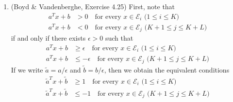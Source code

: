 \documentclass[letterpaper,12pt]{article}
\begin{document}
\begin{enumerate}
\begin{enumerate}
\end{enumerate}

\item (Boyd \& Vandenberghe, Exercise 4.25) First, note that
  \begin{align*}
    a^T x + b &> 0
      \quad \text{for every $x \in \mathcal{E}_i$ ($1 \leq i \leq K$)} \\
    a^T x + b &< 0
      \quad \text{for every $x \in \mathcal{E}_j$ ($K+1 \leq j \leq K+L$)}
  \end{align*}
  if and only if there exists $\epsilon > 0$ such that
  \begin{align*}
    a^T x + b &\geq \epsilon
      \quad \text{for every $x \in \mathcal{E}_i$ ($1 \leq i \leq K$)} \\
    a^T x + b &\leq -\epsilon
      \quad \text{for every $x \in \mathcal{E}_j$ ($K+1 \leq j \leq K+L$)}
  \end{align*}
  If we write $\tilde{a} = a / \epsilon$ and
  $\tilde{b} = b / \epsilon$, then we obtain the equivalent conditions
  \begin{align*}
    \tilde{a}^T x + \tilde{b} &\geq 1
      \quad \text{for every $x \in \mathcal{E}_i$ ($1 \leq i \leq K$)} \\
    \tilde{a}^T x + \tilde{b} &\leq -1
      \quad \text{for every $x \in \mathcal{E}_j$ ($K+1 \leq j \leq K+L$)}
  \end{align*}


\end{enumerate}
\end{document}
